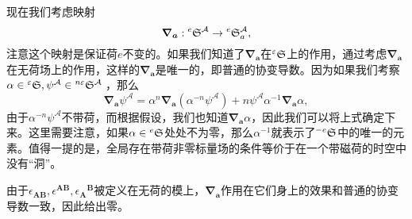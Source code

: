现在我们考虑映射
\begin{equation*}
	\boldsymbol{\nabla }_{\boldsymbol{a}} :\prescript{e}{}{}\mathfrak{S}^{\mathcal{A}}\rightarrow \prescript{e}{}{}\mathfrak{S}_{a}^{\mathcal{A}} ,
\end{equation*}
注意这个映射是保证荷$e$不变的。如果我们知道了$\boldsymbol{\nabla }_{\boldsymbol{a}}$在$\prescript{\varepsilon }{}{}\mathfrak{S}$上的作用，通过考虑$\boldsymbol{\nabla }_{\boldsymbol{a}}$在无荷场上的作用，这样的$\boldsymbol{\nabla }_{\boldsymbol{a}}$是唯一的，即普通的协变导数。因为如果我们考察$\alpha \in \prescript{\varepsilon }{}{}\mathfrak{S} ,\psi ^{\mathcal{A}} \in \prescript{n\varepsilon }{}{}\mathfrak{S}^{\mathcal{A}}\prescript{}{}{}$，那么
\begin{equation*}
	\boldsymbol{\nabla }_{\boldsymbol{a}} \psi ^{\mathcal{A}} =\alpha ^{n}\boldsymbol{\nabla }_{\boldsymbol{a}} (\alpha ^{-n} \psi ^{\mathcal{A}} )+n\psi ^{\mathcal{A}} \alpha ^{-1}\boldsymbol{\nabla }_{\boldsymbol{a}} \alpha ,
\end{equation*}
由于$\alpha ^{-n} \psi ^{\mathcal{A}}$不带荷，而根据假设，我们也知道$\boldsymbol{\nabla }_{\boldsymbol{a}} \alpha $，因此我们可以将上式确定下来。这里需要注意，如果$\alpha \in \prescript{e}{}{}\mathfrak{S}$处处不为零，那么$\alpha ^{-1}$就表示了$\prescript{-e}{}{}\mathfrak{S}$中的唯一的元素。值得一提的是，全局存在带荷非零标量场的条件等价于在一个带磁荷的时空中没有“洞”。



由于$\epsilon _{\boldsymbol{AB}} ,\epsilon ^{\boldsymbol{AB}} ,\epsilon {_{\boldsymbol{A}}}^{\boldsymbol{B}}$被定义在无荷的模上，$\boldsymbol{\nabla }_{\boldsymbol{a}}$作用在它们身上的效果和普通的协变导数一致，因此给出零。



